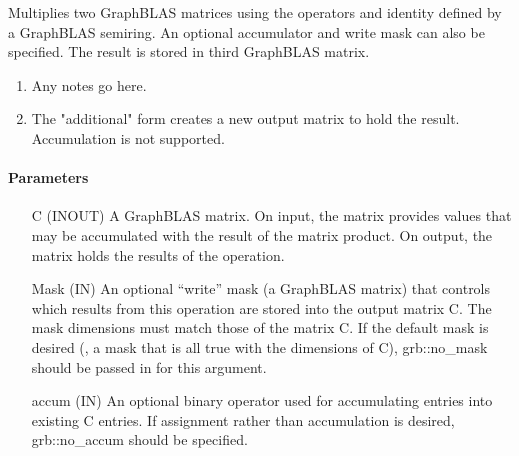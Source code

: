 Multiplies two GraphBLAS matrices using the operators and identity defined by a GraphBLAS semiring. An optional accumulator and write mask can also be specified. The result is stored in third GraphBLAS matrix.

\begin{enumerate}
\item Any notes go here.
\item The "additional" form creates a new output matrix to hold the result.  Accumulation is not supported.
\end{enumerate}

\paragraph{Parameters}

\begin{itemize}[leftmargin=1.1in]
    \item[{\sf C}]    ({\sf INOUT}) A GraphBLAS matrix. On input,
    the matrix provides values that may be accumulated with the result of the
    matrix product.  On output, the matrix holds the results of the
    operation.

    \item[{\sf Mask}] ({\sf IN}) An optional ``write'' mask (a GraphBLAS matrix) that controls which
    results from this operation are stored into the output matrix {\sf C}. The 
    mask dimensions must match those of the matrix {\sf C}. 
    If the default
    mask is desired (\ie, a mask that is all {\sf true} with the dimensions of {\sf C}), 
    {\sf grb::no\_mask} should be passed in for this argument.

    \item[{\sf accum}] ({\sf IN}) An optional binary operator used for accumulating
    entries into existing {\sf C} entries.  If assignment rather than accumulation is
    desired, {\sf grb::no\_accum} should be specified.


\end{itemize}
